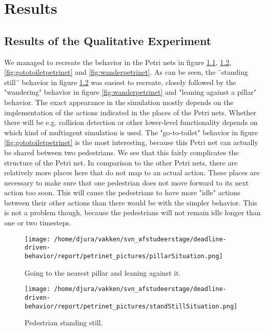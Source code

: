 \documentclass[11pt]{book}
\begin{document}
\graphicspath{{.}{../results}}

\chapter{Results}
\label{chap:results}

\section{Results of the Qualitative Experiment}
\label{sec:qualitativeresults}
We managed to recreate the behavior in the Petri nets in figure \ref{fig:pillarpetrinet}, \ref{fig:standstillpetrinet}, \ref{fig:gototoiletpetrinet} and \ref{fig:wanderpetrinet}. As can be seen, the ¨standing still¨ behavior in figure \ref{fig:standstillpetrinet} was easiest to recreate, closely followed by the "wandering" behavior in figure \ref{fig:wanderpetrinet} and "leaning against a pillar" behavior. The exact appearance in the simulation mostly depends on the implementation of the actions indicated in the places of the Petri nets. Whether there will be e.g. collision detection or other lower-level functionality depends on which kind of multiagent simulation is used. The "go-to-toilet" behavior in figure \ref{fig:gototoiletpetrinet} is the most interesting, because this Petri net can actually be shared between two pedestrians. We see that this fairly complicates the structure of the Petri net. In comparison to the other Petri nets, there are relatively more places here that do not map to an actual action. These places are necessary to make sure that one pedestrian does not move forward to its next action too soon. This will cause the pedestrians to have more "idle" actions between their other actions than there would be with the simpler behavior. This is not a problem though, because the pedestrians will not remain idle longer than one or two timesteps.


\begin{figure}
\centering            
\texttt{[image: /home/djura/vakken/svn\_afstudeerstage/deadline-driven-behavior/report/petrinet\_pictures/pillarSituation.png]}
\caption{Going to the nearest pillar and leaning against it.}
\label{fig:pillarpetrinet}
\end{figure}

\begin{figure}
\centering            
\texttt{[image: /home/djura/vakken/svn\_afstudeerstage/deadline-driven-behavior/report/petrinet\_pictures/standStillSituation.png]}
\caption{Pedestrian standing still.}
\label{fig:standstillpetrinet}
\end{figure}
\end{document}
